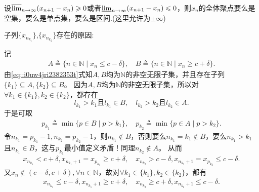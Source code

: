 \documentclass[../../main.tex]{subfiles}%
\begin{document}
\begin{lemma}[稠密聚点引理]\label{lemma:稠密聚点引理}
设\( \varlimsup_{n \to \infty} (x_{n+1} - x_n) \geqslant 0 \)或者\( \varliminf_{n \to \infty} (x_{n+1} - x_n) \leqslant 0 \)，则\( x_n \)的全体聚点要么是空集，要么是单点集，要么是区间.(这里允许为\( \pm \infty \))
\end{lemma}
\begin{note}
\hypertarget{n1n2子列存在的原因}{子列$\{x_{n_{k_1}}\}$,$\{x_{n_{k_2}}\}$存在的原因:}记
\begin{align*}
A \triangleq \{ n \in \mathbb{N} \mid x_n \leqslant c - \delta \}, \quad B \triangleq \{ n \in \mathbb{N} \mid x_n \geqslant c + \delta \}.
\end{align*}
由\eqref{eq::i0uw4jri2382353t}式知\( A, B \)均为\( \mathbb{N} \)的非空无限子集，并且存在子列\( \{ k_1 \} \subseteq A, \{ k_2 \} \subseteq B \)。
因为\( A, B \)均为\( \mathbb{N} \)的非空无限子集，所以对\( \forall k_1 \in \{ k_1 \}, k_2 \in \{ k_2 \} \)，都存在
\[
l_{k_1} > k_1 \text{且} l_{k_1} \in B, \quad l_{k_2} > k_2 \text{且} l_{k_2} \in A.
\]
于是可取
\begin{align*}
p_{k_1} \triangleq \min \{ p \in B \mid p > k_1 \}, \quad p_{k_2} \triangleq \min \{ p \in A \mid p > k_2 \}.
\end{align*}
令\( n_{k_1} = p_{k_1} - 1, n_{k_2} = p_{k_2} - 1 \)，则\( n_{k_1} \notin B \)，否则要么\( n_{k_1} = k_1 \notin B \)，要么\( n_{k_1} > k_1 \)且\( n_{k_1} \in B \)，这与\( p_{k_1} \)最小值定义矛盾！同理\( n_{k_2} \notin A \)。
从而
\begin{align*}
x_{n_{k_1}} < c + \delta, x_{n_{k_1} + 1} = x_{p_{k_1}} \geqslant c + \delta, \quad x_{n_{k_2}} > c - \delta, x_{n_{k_2} + 1} = x_{p_{k_2}} \leqslant c - \delta.
\end{align*}
又\( x_n \notin (c - \delta, c + \delta), \forall n \in \mathbb{N} \)，故对\( \forall k_1 \in \{ k_1 \}, k_2 \in \{ k_2 \} \)，都有
\begin{align*}
x_{n_{k_1}} \leqslant c - \delta, x_{n_{k_1} + 1} \geqslant c + \delta, \quad x_{n_{k_2}} \geqslant c + \delta, x_{n_{k_2} + 1} \leqslant c - \delta.
\end{align*}
\end{note}
\end{document}
